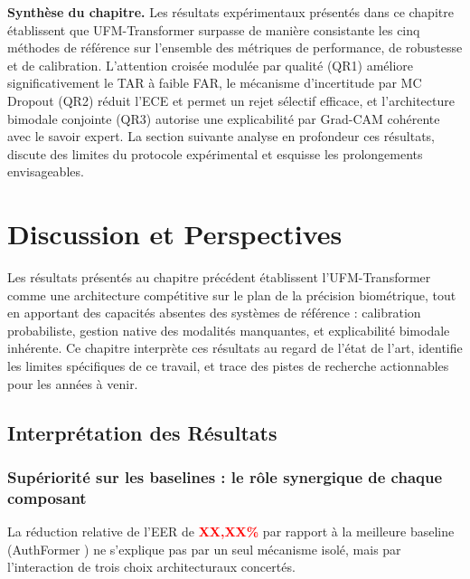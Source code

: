 \documentclass[12pt,a4paper]{report}
\begin{document}
\vspace{0.5em}
\noindent\textbf{Synth\`{e}se du chapitre.} Les r\'{e}sultats exp\'{e}rimentaux pr\'{e}sent\'{e}s dans ce chapitre \'{e}tablissent que UFM-Transformer surpasse de mani\`{e}re consistante les cinq m\'{e}thodes de r\'{e}f\'{e}rence sur l'ensemble des m\'{e}triques de performance, de robustesse et de calibration. L'attention crois\'{e}e modul\'{e}e par qualit\'{e} (QR1) am\'{e}liore significativement le TAR \`{a} faible FAR, le m\'{e}canisme d'incertitude par MC Dropout (QR2) r\'{e}duit l'ECE et permet un rejet s\'{e}lectif efficace, et l'architecture bimodale conjointe (QR3) autorise une explicabilit\'{e} par Grad-CAM coh\'{e}rente avec le savoir expert. La section suivante analyse en profondeur ces r\'{e}sultats, discute des limites du protocole exp\'{e}rimental et esquisse les prolongements envisageables.


\chapter{Discussion et Perspectives}
\label{chap:discussion}

Les r\'{e}sultats pr\'{e}sent\'{e}s au chapitre pr\'{e}c\'{e}dent \'{e}tablissent l'UFM-Transformer comme une architecture comp\'{e}titive sur le plan de la pr\'{e}cision biom\'{e}trique, tout en apportant des capacit\'{e}s absentes des syst\`{e}mes de r\'{e}f\'{e}rence : calibration probabiliste, gestion native des modalit\'{e}s manquantes, et explicabilit\'{e} bimodale inh\'{e}rente. Ce chapitre interpr\`{e}te ces r\'{e}sultats au regard de l'\'{e}tat de l'art, identifie les limites sp\'{e}cifiques de ce travail, et trace des pistes de recherche actionnables pour les ann\'{e}es \`{a} venir.

\section{Interpr\'{e}tation des R\'{e}sultats}
\label{sec:interpretation}

\subsection{Sup\'{e}riorit\'{e} sur les baselines : le r\^{o}le synergique de chaque composant}

La r\'{e}duction relative de l'EER de \textcolor{red}{\textbf{XX,XX\%}} par rapport \`{a} la meilleure baseline (AuthFormer \cite{yang2024authformer}) ne s'explique pas par un seul m\'{e}canisme isol\'{e}, mais par l'interaction de trois choix architecturaux concert\'{e}s.
\end{document}
